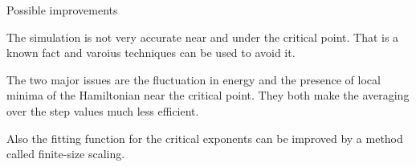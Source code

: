 \documentclass{beamer}
\begin{document}
\begin{frame}{Possible improvements}

The simulation is not very accurate near and under the critical point. That is a 
known fact and varoius techniques can be used to avoid it.

\vspace{5mm}

The two major issues are the fluctuation in energy and the presence of local
minima of the Hamiltonian near the critical point. They both make the averaging
over the step values much less efficient. 

\vspace{5mm}

Also the fitting function for the critical exponents can be improved by a method
called finite-size scaling.
\end{frame}
\end{document}
